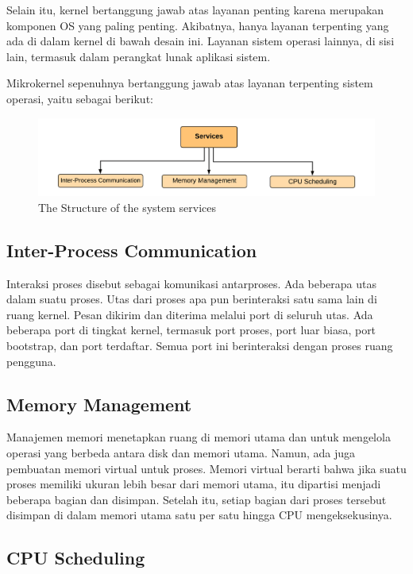 \documentclass{report}
\begin{document}
	Selain itu, kernel bertanggung jawab atas layanan penting karena merupakan komponen OS yang paling penting. Akibatnya, hanya layanan terpenting yang ada di dalam kernel di bawah desain ini. Layanan sistem operasi lainnya, di sisi lain, termasuk dalam perangkat lunak aplikasi sistem.
	
	Mikrokernel sepenuhnya bertanggung jawab atas layanan terpenting sistem operasi, yaitu sebagai berikut:
	
	\begin{figure}
		\centering
		\includegraphics[width=12cm]{Mikrokernel-2.png}
		\caption{The Structure of the system services}
	\end{figure}
	
	\subsection*{Inter-Process Communication}
	
	Interaksi proses disebut sebagai komunikasi antarproses. Ada beberapa utas dalam suatu proses. Utas dari proses apa pun berinteraksi satu sama lain di ruang kernel. Pesan dikirim dan diterima melalui port di seluruh utas. Ada beberapa port di tingkat kernel, termasuk port proses, port luar biasa, port bootstrap, dan port terdaftar. Semua port ini berinteraksi dengan proses ruang pengguna.
	
	\subsection*{Memory Management}
	
	Manajemen memori menetapkan ruang di memori utama dan untuk mengelola operasi yang berbeda antara disk dan memori utama. Namun, ada juga pembuatan memori virtual untuk proses. Memori virtual berarti bahwa jika suatu proses memiliki ukuran lebih besar dari memori utama, itu dipartisi menjadi beberapa bagian dan disimpan. Setelah itu, setiap bagian dari proses tersebut disimpan di dalam memori utama satu per satu hingga CPU mengeksekusinya.
	
	\subsection*{CPU Scheduling}
	
\end{document}
